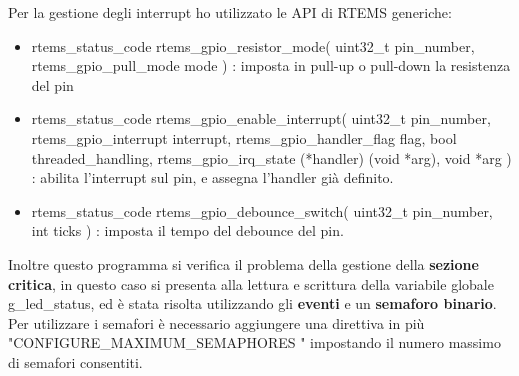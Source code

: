 \documentclass[12pt, a4paper, titlepage, oneside]{book}
\begin{document}
\begin{flushleft}
Per la gestione degli interrupt ho utilizzato le API di RTEMS generiche:
\begin{itemize}
    \item rtems\_status\_code rtems\_gpio\_resistor\_mode(
  uint32\_t pin\_number,
   rtems\_gpio\_pull\_mode mode
) : imposta in pull-up o pull-down la resistenza del pin
    \item rtems\_status\_code rtems\_gpio\_enable\_interrupt(
  uint32\_t pin\_number,
  rtems\_gpio\_interrupt interrupt,
  rtems\_gpio\_handler\_flag flag,
  bool threaded\_handling,
  rtems\_gpio\_irq\_state (*handler) (void *arg),
  void *arg
) : abilita l'interrupt sul pin, e assegna l'handler già definito.
    \item rtems\_status\_code rtems\_gpio\_debounce\_switch(
  uint32\_t pin\_number,
  int ticks
) : imposta il tempo del debounce del pin. 
\end{itemize}
Inoltre questo programma si verifica il problema della gestione della \textbf{sezione critica}, in questo caso si presenta alla lettura e scrittura della variabile globale g\_led\_status, ed è stata risolta utilizzando gli \textbf{eventi} e un \textbf{semaforo binario}.\\
Per utilizzare i semafori è necessario aggiungere una direttiva in più "CONFIGURE\_MAXIMUM\_SEMAPHORES " impostando il numero massimo di semafori consentiti.\\


\end{flushleft}
\end{document}
